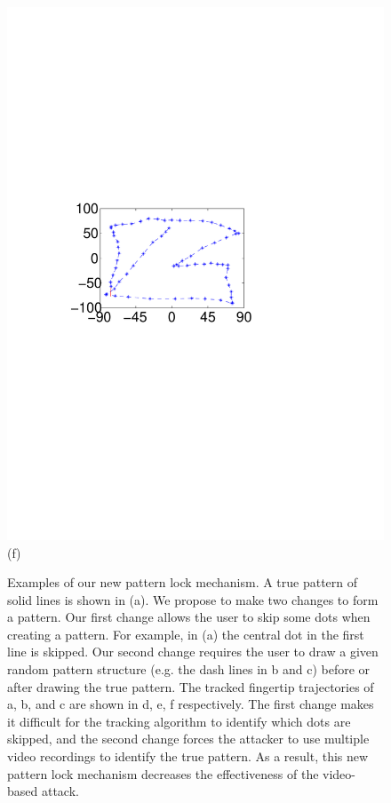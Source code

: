 \begin{figure}[!t]
{\begin{minipage}[t]{0.15\textwidth}
                \includegraphics[width=\textwidth]{fig/protection3-1.pdf}\\
                \centering \footnotesize (f)
             \end{minipage}
        }
        \caption{Examples of our new pattern lock mechanism. A true pattern of solid lines is shown
        in (a). We propose to make two changes to form a pattern.
        Our first change allows the user to skip some dots when creating a pattern.
        For example, in (a) the central dot in the first line is skipped.
        Our second change requires the user to draw a given random pattern structure (e.g. the dash lines in b and c)  before or after drawing the true pattern.
        The tracked fingertip trajectories of a, b, and c are shown in d, e, f respectively.
        The first change makes it difficult for the tracking algorithm to identify which dots are skipped, and the second change
         forces the attacker to use multiple video recordings to identify the true pattern. As a result, this new pattern lock mechanism decreases the
        effectiveness of the video-based attack.
        }
        \label{fig:protection}
    \end{figure}

